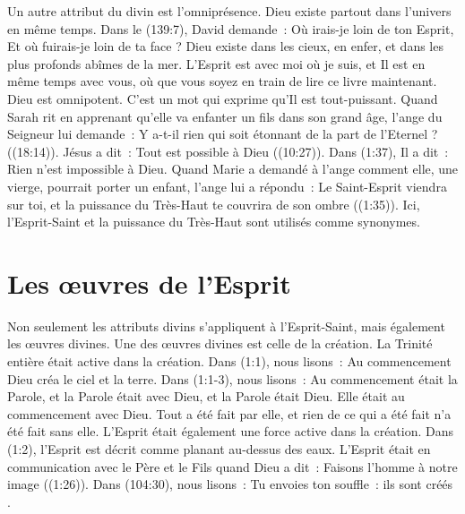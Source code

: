 Un autre attribut du divin est l'omniprésence. Dieu existe partout dans
 l'univers en même temps. Dans le (139:7), David demande~:
 \og Où irais-je loin de ton Esprit, Et où fuirais-je loin de ta face ? \fg{}
 Dieu existe dans les cieux, en enfer, et dans les plus profonds abîmes de
 la mer. L'Esprit est avec moi où je suis, et Il est en même temps avec vous,
 où que vous soyez en train de lire ce livre maintenant. Dieu est omnipotent.
 C'est un mot qui exprime qu'Il est tout-puissant. Quand Sarah rit en apprenant
 qu'elle va enfanter un fils dans son grand âge, l'ange du Seigneur lui demande~:
 \og Y a-t-il rien qui soit étonnant de la part de l'Eternel ? \fg{}
 ((18:14)). Jésus a dit~: \og Tout est possible à Dieu \fg{}
 ((10:27)). Dans (1:37), Il a dit~:
 \og Rien n'est impossible à Dieu. \fg{} Quand Marie a demandé à l'ange comment
 elle, une vierge, pourrait porter un enfant, l'ange lui a répondu~:
 \og Le Saint-Esprit viendra sur toi, et la puissance du Très-Haut te couvrira
 de son ombre \fg{} ((1:35)). Ici, l'Esprit-Saint et
 la puissance du Très-Haut sont utilisés comme synonymes.

\section*{Les œuvres de l'Esprit}


Non seulement les attributs divins s'appliquent à l'Esprit-Saint, mais
 également les œuvres divines.
 Une des œuvres divines est celle de la création.
 La Trinité entière était active dans la création.
 Dans (1:1), nous lisons~:
 \og Au commencement Dieu créa le ciel et la terre. \fg{}
 Dans (1:1-3), nous lisons~:
 \og Au commencement était la Parole, et la Parole était avec Dieu,
 et la Parole était Dieu. Elle était au commencement avec Dieu.
 Tout a été fait par elle, et rien de ce qui a été fait n'a été fait
 sans elle. \fg{}
 L'Esprit était également une force active dans la création.
 Dans (1:2), l'Esprit est décrit comme planant au-dessus
 des eaux. L'Esprit était en communication avec le Père et le Fils quand
 Dieu a dit~: \og Faisons l'homme à notre image \fg{} ((1:26)).
 Dans (104:30), nous lisons~:
 \og Tu envoies ton souffle~: ils sont créés \fg{}
 .

